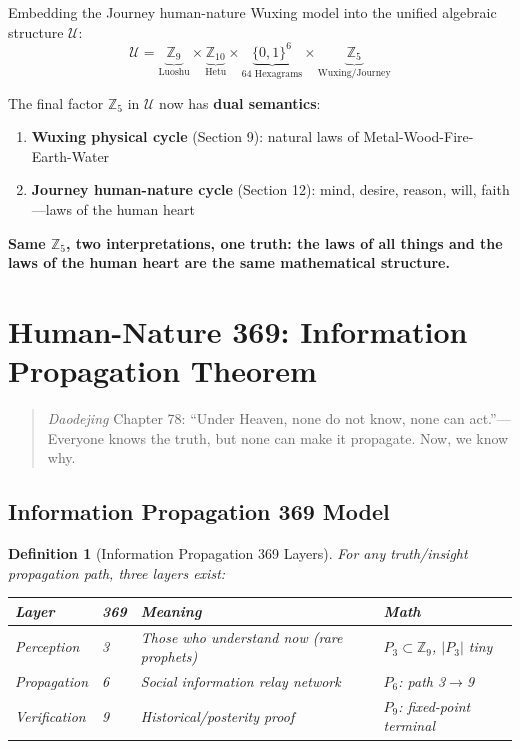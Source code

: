 \documentclass[conference]{IEEEtran}
\newtheorem{definition}[theorem]{Definition}
\theoremstyle{remark}
\newcommand{\Z}{\mathbb{Z}}
\newcommand{\U}{\mathcal{U}}
\begin{document}
Embedding the Journey human-nature Wuxing model into the unified algebraic structure $\U$:
\[
\U = \underbrace{\Z_9}_{\text{Luoshu}} \times \underbrace{\Z_{10}}_{\text{Hetu}} \times \underbrace{\{0,1\}^6}_{\text{64 Hexagrams}} \times \underbrace{\Z_5}_{\text{Wuxing/Journey}}
\]

The final factor $\Z_5$ in $\U$ now has \textbf{dual semantics}:
\begin{enumerate}[nosep]
\item \textbf{Wuxing physical cycle} (Section 9): natural laws of Metal-Wood-Fire-Earth-Water
\item \textbf{Journey human-nature cycle} (Section 12): mind, desire, reason, will, faith---laws of the human heart
\end{enumerate}

\textbf{Same $\Z_5$, two interpretations, one truth: the laws of all things and the laws of the human heart are the same mathematical structure.}

\section{Human-Nature 369: Information Propagation Theorem}

\begin{quote}
\emph{Daodejing} Chapter 78: ``Under Heaven, none do not know, none can act.''---Everyone knows the truth, but none can make it propagate. Now, we know why.
\end{quote}

\subsection{Information Propagation 369 Model}

\begin{definition}[Information Propagation 369 Layers]
For any truth/insight propagation path, three layers exist:

\vspace{4pt}
\begin{tabular}{p{2cm}p{1.5cm}p{3.5cm}p{2cm}}
\toprule
Layer & 369 & Meaning & Math \\
\midrule
Perception & 3 & Those who understand now (rare prophets) & $P_3\subset\Z_9$, $|P_3|$ tiny \\
Propagation & 6 & Social information relay network & $P_6$: path 3$\to$9 \\
Verification & 9 & Historical/posterity proof & $P_9$: fixed-point terminal \\
\bottomrule
\end{tabular}
\end{definition}
\end{document}
